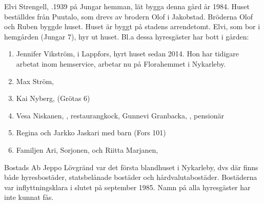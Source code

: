 Elvi Strengell, .1939 på Jungar hemman, lät bygga denna gård år 1984. Huset beställdes från Puutalo, som drevs av brodern Olof i Jakobstad. Bröderna Olof och Ruben byggde huset. Huset är byggt på stadens arrendetomt. Elvi, som bor i hemgården (Jungar 7), hyr ut huset. Bl.a dessa hyresgäster har bott i gården:
\begin{enumerate}
  \item Jennifer Vikström,  i Lappfors, hyrt huset sedan 2014. Hon har tidigare arbetat inom hemservice, arbetar nu på Florahemmet i Nykarleby.
  \item Max Ström, 
  \item Kai Nyberg,  (Grötas 6)
  \item Vesa Niskanen, , restaurangkock, Gunnevi Granbacka, , pensionär
  \item Regina  och Jarkko Jaskari med barn (Fors 101)
  \item Familjen Ari, Sorjonen,  och Riitta Marjanen, 
\end{enumerate}






Bostads Ab Jeppo Lövgränd var det första blandhuset i Nykarleby, dvs där finns både hyresbostäder, statsbelånade bostäder och hårdvalutabostäder. Bostäderna var inflyttningsklara i slutet på september 1985. Namn på alla hyresgäster har inte kunnat fås.\jhvspace{}


\jhvspace[10]

